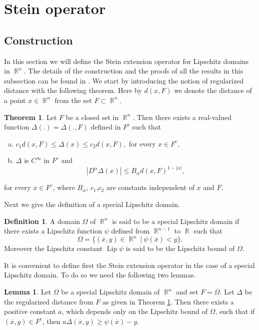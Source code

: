\documentclass[12pt]{article}
\theoremstyle{definition}
\newtheorem{definition}{Definition}
\newtheorem{theorem}{Theorem}
\newtheorem{lemma}{Lemma}
\DeclareMathOperator\Lip{Lip}
\DeclareMathOperator\rr{\mathbb{R}}
\begin{document}
\section{Stein operator}

\subsection{Construction}
In this section we will define the Stein extension operator for Lipschitz domains in $\rr^n$. The details of the construction and the proofs of all the results in this subsection can be found in \cite[Section 2-3, Ch. VI]{stein}. We start by introducing the notion of regularized distance with the following theorem. Here by $d(x,F)$ we denote the distance of a point $x \in \rr^n$ from the set $F\subset \rr^n.$ 

\begin{theorem}\label{regdist}
Let $F$ be a closed set in $\rr^n$. Then there exists a real-valued function $\Delta(.)=\Delta(.,F)$ defined in $F^c$ such that
\begin{enumerate}[a)]
\item $c_1 d(x,F)\le \Delta(x)\le c_2d (x,F),$ for every $x \in F^c,$  
\item $\Delta$ is $C^\infty$ in $F^c$ and
\[ \left | D^\alpha \Delta(x) \right | \le B_\alpha d(x,F)^{1-|\alpha|},\]
\end{enumerate}
for every $x \in F^c$, where $B_\alpha$, $c_1$,$c_2$ are constants independent of $x$ and $F$.
\end{theorem}
Next we give the definition of a special Lipschitz domain.
\begin{definition}
A domain $\Omega$ of $\rr^n$ is said to be a special Lipschitz domain if there exists a Lipschitz function $\psi$ defined from $\rr^{n-1}$ to $\rr$ such that
\[ \Omega=\{(\overline x, y) \in \rr^n \ | \ \psi(\overline x)<y \}.\]
Moreover the Lipschitz constant $\Lip \psi$ is said to be the Lipschitz bound of $\Omega.$ 
\end{definition}
It is convenient to define first the Stein extension operator in the case of a special Lipschitz domain. To do so we need the following two lemmas.
\begin{lemma}\label{lemma1}
Let $\Omega$ be a special Lipschitz domain of $\rr^n$ and set $F=\overline \Omega$. Let $\Delta$ be the regularized distance from $F$ as given in Theorem \ref{regdist}. Then there exists a positive constant $a$, which depends only on the Lipschitz bound of $\Omega$, such that if $(\overline x, y) \in F^c$, then $a\Delta(\overline x,y)\ge \psi(\overline x)- y.$
\end{lemma}
\end{document}
